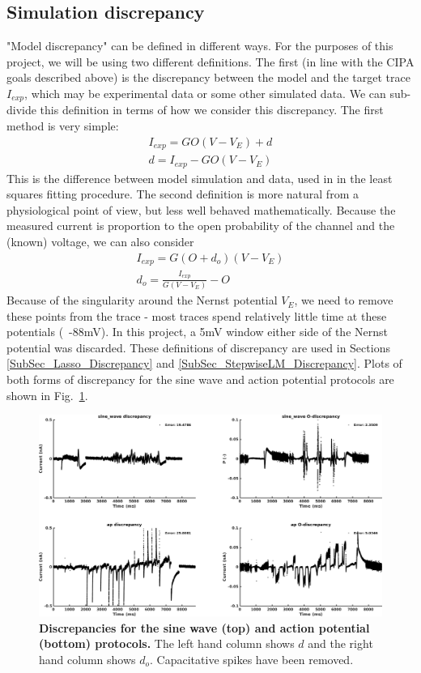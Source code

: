 \documentclass[11pt,a4paper,oneside]{article}
\begin{document}
\subsection{Simulation discrepancy}
"Model discrepancy" can be defined in different ways. For the purposes of this project, we will be using two different definitions. The first (in line with the CIPA goals described above) is the discrepancy between the model and the target trace $I_{exp}$, which may be experimental data or some other simulated data. We can sub-divide this definition in terms of how we consider this discrepancy. The first method is very simple:
\begin{align}
	I_{exp} = G O ( V - V_E ) + d\\
	d = I_{exp} - G O ( V - V_E ) \label{discrepancy_d}
\end{align}
This is the difference between model simulation and data, used in \cite{Beattie2018} in the least squares fitting procedure. The second definition is more natural from a physiological point of view, but less well behaved mathematically. Because the measured current is proportion to the open probability of the channel and the (known) voltage, we can also consider
\begin{align}
	I_{exp} = G ( O + d_o ) ( V - V_E )\\
	d_o = \frac{I_{exp} }{ G( V - V_E ) } - O \label{discrepancy_do}
\end{align}
Because of the singularity around the Nernst potential $V_E$, we need to remove these points from the trace - most traces spend relatively little time at these potentials (~-88mV). In this project, a 5mV window either side of the Nernst potential was discarded. These definitions of discrepancy are used in Sections \ref{SubSec_Lasso_Discrepancy} and \ref{SubSec_StepwiseLM_Discrepancy}. Plots of both forms of discrepancy for the sine wave and action potential protocols are shown in Fig.~\ref{Fig_Discrepancy}.

\begin{figure}[t]
\begin{center}
\includegraphics[scale=0.42]{Figures/PlotDiscrepancyVsDiscrepancyInOpen_sine_wave_ap.png}
\caption{\textbf{Discrepancies for the sine wave (top) and action potential (bottom) protocols.} The left hand column shows $d$ and the right hand column shows $d_o$. Capacitative spikes have been removed.}
\label{Fig_Discrepancy}
\end{center}
\end{figure}
\end{document}
